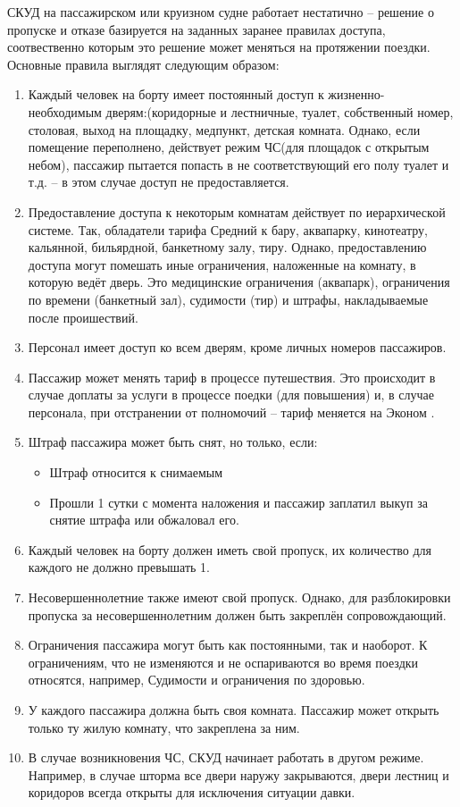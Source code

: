 СКУД на пассажирском или круизном судне работает нестатично -- решение о пропуске и отказе базируется на заданных заранее правилах доступа, соотвественно которым это решение может меняться на протяжении поездки. Основные правила выглядят следующим образом:
\begin{enumerate}
	\item Каждый человек на борту имеет постоянный доступ к жизненно-необходимым дверям:(коридорные и лестничные, туалет, собственный номер, столовая, выход на площадку, медпункт, детская комната.
	Однако, если помещение переполнено, действует режим ЧС(для площадок с открытым небом), пассажир пытается попасть в не соответствующий его полу туалет и т.д. -- в этом случае доступ не предоставляется.
	\item Предоставление доступа к некоторым комнатам действует по иерархической системе. Так, обладатели тарифа \textquotedbl Средний \textquotedbl к бару, аквапарку, кинотеатру, кальянной, бильярдной, банкетному залу, тиру.
	Однако, предоставлению доступа могут помешать иные ограничения, наложенные на комнату, в которую ведёт дверь. Это медицинские ограничения (аквапарк), ограничения по времени (банкетный зал), судимости (тир) и штрафы, накладываемые после проишествий.
	\item Персонал имеет доступ ко всем дверям, кроме личных номеров пассажиров.
	\item Пассажир может менять тариф в процессе путешествия. Это происходит в случае доплаты за услуги в процессе поедки (для повышения) и, в случае персонала, при отстранении от полномочий -- тариф меняется на \textquotedbl Эконом \textquotedbl.
	\item Штраф пассажира может быть снят, но только, если:
	\begin{itemize}
		\item Штраф относится к снимаемым
		\item Прошли 1 сутки с момента наложения и пассажир заплатил выкуп за снятие штрафа или обжаловал его.
	\end{itemize}
	\item Каждый человек на борту должен иметь свой пропуск, их количество для каждого не должно превышать 1.
	\item Несовершеннолетние также имеют свой пропуск.
	Однако, для разблокировки пропуска за несовершеннолетним должен быть закреплён сопровождающий.
	\item Ограничения пассажира могут быть как постоянными, так и наоборот. К ограничениям, что не изменяются и не оспариваются во время поездки относятся, например, Судимости и ограничения по здоровью.
	\item У каждого пассажира должна быть своя комната. Пассажир может открыть только ту жилую комнату, что закреплена за ним.
	\item В случае возникновения ЧС, СКУД начинает работать в другом режиме.
	Например, в случае шторма все двери наружу закрываются, двери лестниц и коридоров всегда открыты для исключения ситуации давки.
\end{enumerate}  